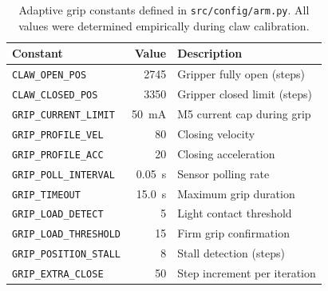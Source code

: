 \begin{table}[H]
    \centering
    \renewcommand{\arraystretch}{1.3}
    \begin{tabular}{|l|r|p{5.5cm}|}
        \hline
        \textbf{Constant} & \textbf{Value} &
        \textbf{Description} \\
        \hline
        \texttt{CLAW\_OPEN\_POS}   & 2745 &
        Gripper fully open (steps) \\
        \hline
        \texttt{CLAW\_CLOSED\_POS} & 3350 &
        Gripper closed limit (steps) \\
        \hline
        \texttt{GRIP\_CURRENT\_LIMIT} & 50~mA &
        M5 current cap during grip \\
        \hline
        \texttt{GRIP\_PROFILE\_VEL} & 80 &
        Closing velocity \\
        \hline
        \texttt{GRIP\_PROFILE\_ACC} & 20 &
        Closing acceleration \\
        \hline
        \texttt{GRIP\_POLL\_INTERVAL} & 0.05~s &
        Sensor polling rate \\
        \hline
        \texttt{GRIP\_TIMEOUT} & 15.0~s &
        Maximum grip duration \\
        \hline
        \texttt{GRIP\_LOAD\_DETECT} & 5 &
        Light contact threshold \\
        \hline
        \texttt{GRIP\_LOAD\_THRESHOLD} & 15 &
        Firm grip confirmation \\
        \hline
        \texttt{GRIP\_POSITION\_STALL} & 8 &
        Stall detection (steps) \\
        \hline
        \texttt{GRIP\_EXTRA\_CLOSE} & 50 &
        Step increment per iteration \\
        \hline
    \end{tabular}
    \caption{Adaptive grip constants defined in
    \texttt{src/config/arm.py}. All values were determined
    empirically during claw calibration.}
\end{table}
